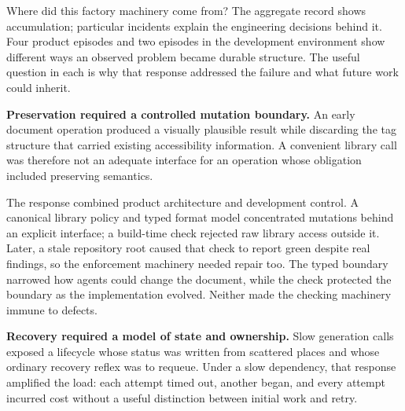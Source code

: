 
Where did this factory machinery come from? The aggregate record shows accumulation; particular incidents explain the engineering decisions behind it. Four product episodes and two episodes in the development environment show different ways an observed problem became durable structure. The useful question in each is why that response addressed the failure and what future work could inherit.


\textbf{Preservation required a controlled mutation boundary.} An early document operation produced a visually plausible result while discarding the tag structure that carried existing accessibility information. A convenient library call was therefore not an adequate interface for an operation whose obligation included preserving semantics.

The response combined product architecture and development control. A canonical library policy and typed format model concentrated mutations behind an explicit interface; a build-time check rejected raw library access outside it. Later, a stale repository root caused that check to report green despite real findings, so the enforcement machinery needed repair too. The typed boundary narrowed how agents could change the document, while the check protected the boundary as the implementation evolved. Neither made the checking machinery immune to defects.


\textbf{Recovery required a model of state and ownership.} Slow generation calls exposed a lifecycle whose status was written from scattered places and whose ordinary recovery reflex was to requeue. Under a slow dependency, that response amplified the load: each attempt timed out, another began, and every attempt incurred cost without a useful distinction between initial work and retry.

